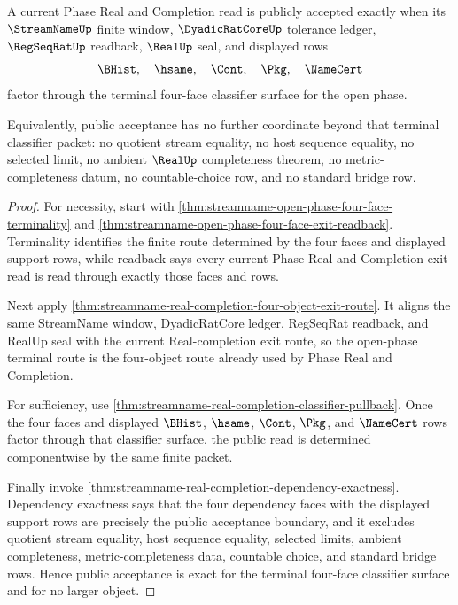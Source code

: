 \begin{theorem}
\label{thm:streamname-open-phase-terminal-classifier-exactness}
A current Phase Real and Completion read is publicly accepted exactly when its $\StreamNameUp$ finite window, $\DyadicRatCoreUp$ tolerance ledger, $\RegSeqRatUp$ readback, $\RealUp$ seal, and displayed rows
$$
\BHist,\quad \hsame,\quad \Cont,\quad \Pkg,\quad \NameCert
$$
factor through the terminal four-face classifier surface for the open phase.

Equivalently, public acceptance has no further coordinate beyond that terminal classifier packet: no quotient stream equality, no host sequence equality, no selected limit, no ambient $\RealUp$ completeness theorem, no metric-completeness datum, no countable-choice row, and no standard bridge row.
\end{theorem}
\begin{proof}
For necessity, start with \autoref{thm:streamname-open-phase-four-face-terminality} and \autoref{thm:streamname-open-phase-four-face-exit-readback}. Terminality identifies the finite route determined by the four faces and displayed support rows, while readback says every current Phase Real and Completion exit read is read through exactly those faces and rows.

Next apply \autoref{thm:streamname-real-completion-four-object-exit-route}. It aligns the same StreamName window, DyadicRatCore ledger, RegSeqRat readback, and RealUp seal with the current Real-completion exit route, so the open-phase terminal route is the four-object route already used by Phase Real and Completion.

For sufficiency, use \autoref{thm:streamname-real-completion-classifier-pullback}. Once the four faces and displayed $\BHist$, $\hsame$, $\Cont$, $\Pkg$, and $\NameCert$ rows factor through that classifier surface, the public read is determined componentwise by the same finite packet.

Finally invoke \autoref{thm:streamname-real-completion-dependency-exactness}. Dependency exactness says that the four dependency faces with the displayed support rows are precisely the public acceptance boundary, and it excludes quotient stream equality, host sequence equality, selected limits, ambient completeness, metric-completeness data, countable choice, and standard bridge rows. Hence public acceptance is exact for the terminal four-face classifier surface and for no larger object.
\end{proof}

